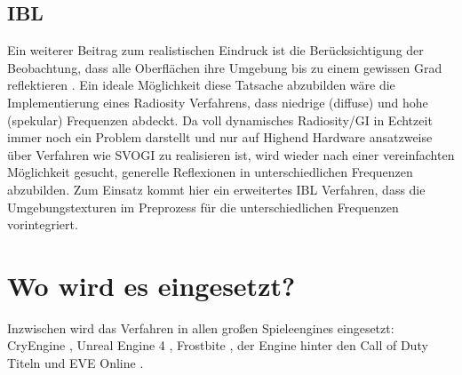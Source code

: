 \subsection[\acl{IBL}]{\acf{IBL}}

Ein weiterer Beitrag zum realistischen Eindruck ist die Berücksichtigung der Beobachtung, dass alle Oberflächen ihre Umgebung bis zu einem gewissen Grad reflektieren \parencite{Hable2010}.  Ein ideale Möglichkeit diese Tatsache abzubilden wäre die Implementierung eines Radiosity Verfahrens, dass niedrige (diffuse) und hohe (spekular) Frequenzen abdeckt. Da voll dynamisches Radiosity/\ac{GI} in Echtzeit immer noch ein Problem darstellt und nur auf Highend Hardware ansatzweise über Verfahren wie \ac{SVOGI} \parencite{Lin2013} zu realisieren ist, wird wieder nach einer vereinfachten Möglichkeit gesucht, generelle Reflexionen in unterschiedlichen Frequenzen abzubilden. Zum Einsatz kommt hier ein erweitertes \acf{IBL} Verfahren, dass die Umgebungstexturen im Preprozess für die unterschiedlichen Frequenzen vorintegriert.

\section{Wo wird es eingesetzt?}
\label{sec:pbr-wo}
Inzwischen wird das Verfahren in allen großen Spieleengines eingesetzt: CryEngine \parencite{Schulz2014}, Unreal Engine 4 \parencite{Martin2012}, Frostbite \parencite{Lagarde2014}, der Engine hinter den Call of Duty Titeln \parencite{Lazarov2011} und EVE Online \parencite{CCP2014}.

